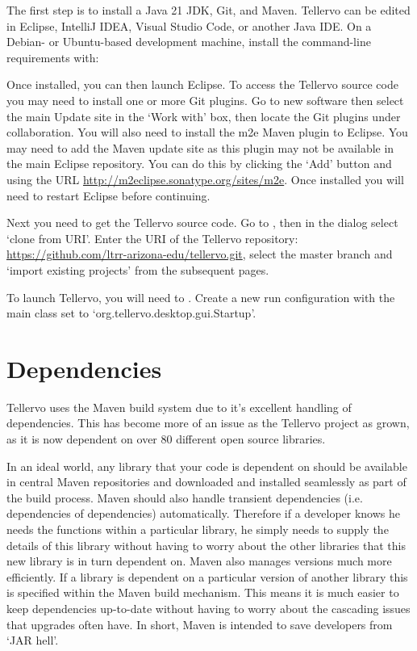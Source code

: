 The first step is to install a Java 21 JDK, Git, and Maven. Tellervo can be
edited in Eclipse, IntelliJ IDEA, Visual Studio Code, or another Java IDE. On a
Debian- or Ubuntu-based development machine, install the command-line
requirements with:


Once installed, you can then launch Eclipse. To access the Tellervo source code you may need to install one or more Git plugins. Go to  new software then select the main Update site in the `Work with' box, then locate the Git plugins under collaboration. You will also need to install the m2e Maven plugin to Eclipse. You may need to add the Maven update site as this plugin may not be available in the main Eclipse repository. You can do this by clicking the `Add' button and using the URL \url{http://m2eclipse.sonatype.org/sites/m2e}. Once installed you will need to restart Eclipse before continuing.

Next you need to get the Tellervo source code. Go to , then in the dialog select `clone from URI'. Enter the URI of the Tellervo repository: \url{https://github.com/ltrr-arizona-edu/tellervo.git}, select the master branch and `import existing projects' from the subsequent pages.

To launch Tellervo, you will need to .  Create a new run configuration with the main class set to `org.tellervo.desktop.gui.Startup'.     


\section{Dependencies}
\label{txt:DependenciesDesktopClient}
Tellervo uses the Maven build system due to it's excellent handling of dependencies.  This has become more of an issue as the Tellervo project as grown, as it is now dependent on over 80 different open source libraries.  

In an ideal world, any library that your code is dependent on should be available in central Maven repositories and downloaded and installed seamlessly as part of the build process.  Maven should also handle transient dependencies (i.e. dependencies of dependencies) automatically.  Therefore if a developer knows he needs the functions within a particular library, he simply needs to supply the details of this library without having to worry about the other libraries that this new library is in turn dependent on.  Maven also manages versions much more efficiently.  If a library is dependent on a particular version of another library this is specified within the Maven build mechanism.  This means it is much easier to keep dependencies up-to-date without having to worry about the cascading issues that upgrades often have.  In short, Maven is intended to save developers from `JAR hell'.

